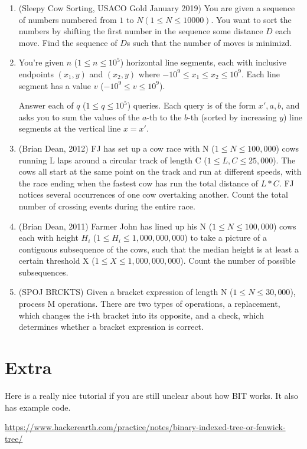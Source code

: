 \documentclass{article}
\begin{document}
\begin{enumerate}
    \item (Sleepy Cow Sorting, USACO Gold January 2019) You are given a sequence of numbers numbered from $1$ to $N (1 \leq N \leq 10000).$ You want to sort the numbers by shifting the first number in the sequence some distance $D$ each move. Find the sequence of $D$s such that the number of moves is minimizd.

    \item You're given $n$ ($1 \leq n \leq 10^5$) horizontal line segments, each with inclusive endpoints $(x_1, y)$ and $(x_2, y)$ where $-10^9 \leq x_1 \leq x_2 \leq 10^9$. Each line segment has a value $v$ ($-10^9 \leq v \leq 10^9$).

Answer each of $q$ ($1 \leq q \leq 10^5$) queries.
Each query is of the form $x', a, b$, and asks you to sum the values of the $a$-th to the $b$-th (sorted by increasing $y$) line segments at the vertical line $x = x'$.

    \item (Brian Dean, 2012) FJ has set up a cow race with N ($1 \leq N \leq 100,000$) cows running L laps around a circular
track of length C ($1 \leq L, C \leq 25,000$). The cows all start at the same point on the track and run at different
speeds, with the race ending when the fastest cow has run the total distance of $L * C$. FJ notices several
occurrences of one cow overtaking another. Count the total number of crossing events during the entire race.

    \item (Brian Dean, 2011) Farmer John has lined up his N ($1 \leq N \leq 100,000$) cows each with height $H_i$ ($1 \leq H_i \leq
1,000,000,000$) to take a picture of a contiguous subsequence of the cows, such that the median height is at
least a certain threshold X ($1 \leq X \leq 1,000,000,000$). Count the number of possible subsequences.

    \item (SPOJ BRCKTS) Given a bracket expression of length N ($1 \leq N \leq 30,000$), process M operations. There are
two types of operations, a replacement, which changes the i-th bracket into its opposite, and a check, which
determines whether a bracket expression is correct.
\end{enumerate} 
        
        
\section{Extra}
Here is a really nice tutorial if you are still unclear about how BIT works. It also has example code.

\url{https://www.hackerearth.com/practice/notes/binary-indexed-tree-or-fenwick-tree/}
\end{document}
